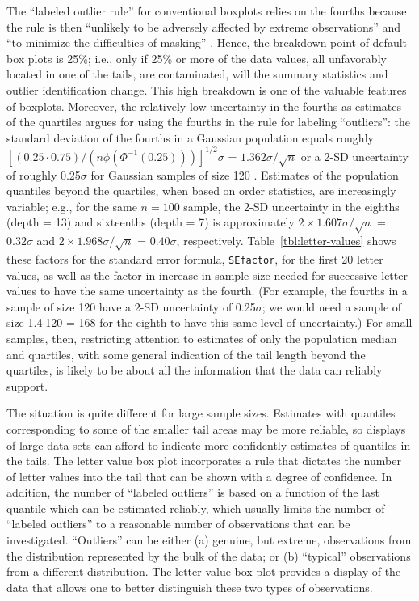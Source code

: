 \documentclass[oneside]{article}
\begin{document}
The ``labeled outlier rule'' for conventional boxplots relies on the fourths
because the rule is then ``unlikely to be adversely affected by extreme
observations'' and ``to minimize the difficulties of masking'' \citep[pg.
992]{dchbox}. Hence, the breakdown point of default box plots is 25\%; i.e.,
only if 25\% or more of the data values, all unfavorably located in one of the
tails, are contaminated, will the summary statistics and outlier
identification change. This high breakdown is one of the valuable features of
boxplots. Moreover, the relatively low uncertainty in the fourths as estimates
of the quartiles argues for using the fourths in the rule for labeling
``outliers'': the standard deviation of the fourths in a Gaussian population
equals roughly $[(0.25 \cdot 0.75) / (n \phi(\Phi^{-1}(0.25)))]^{1/2} \sigma$
= $1.362 \sigma / \sqrt{n}$ or a 2-SD uncertainty of roughly 0.25$\sigma$ for
Gaussian samples of size 120 \citep{ha.order}. Estimates of the population
quantiles beyond the quartiles, when based on order statistics, are
increasingly variable; e.g., for the same $n = 100$ sample, the 2-SD
uncertainty in the eighths (depth = 13) and sixteenths (depth = 7) is
approximately $ 2 \times 1.607 \sigma / \sqrt{n}$ = $0.32 \sigma$ and $ 2
\times 1.968 \sigma / \sqrt{n}$ = $0.40 \sigma$, respectively.
Table~\ref{tbl:letter-values} shows these factors for the standard error
formula, \texttt{SEfactor}, for the first 20 letter values, as well as the
factor in increase in sample size needed for successive letter values to have
the same uncertainty as the fourth. (For example, the fourths in a sample of
size 120 have a 2-SD uncertainty of 0.25$\sigma$; we would need a sample of
size 1.4$\cdot$120 = 168 for the eighth to have this same level of
uncertainty.) For small samples, then, restricting attention to estimates of
only the population median and quartiles, with some general indication of the
tail length beyond the quartiles, is likely to be about all the information
that the data can reliably support.

The situation is quite different for large sample sizes. Estimates with
quantiles corresponding to some of the smaller tail areas may be more
reliable, so displays of large data sets can afford to indicate more
confidently estimates of quantiles in the tails. The letter value box plot
incorporates a rule that dictates the number of letter values into the tail
that can be shown with a degree of confidence. In addition, the number of
``labeled outliers'' is based on a function of the last quantile which can be
estimated reliably, which usually limits the number of ``labeled outliers'' to
a reasonable number of observations that can be investigated. ``Outliers'' can
be either (a) genuine, but extreme, observations from the distribution
represented by the bulk of the data; or (b) ``typical'' observations from a
different distribution. The letter-value box plot provides a display of the
data that allows one to better distinguish these two types of observations.
\end{document}
